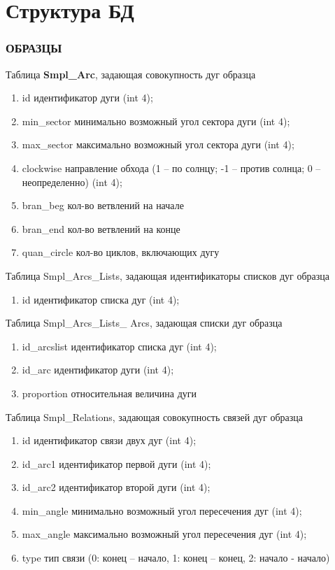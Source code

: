 \appendix
\chapter{Структура БД} \label{AppendixA}
\noindent
\subsection*{ОБРАЗЦЫ}
\noindent
Таблица \textbf{Smpl\_Arc}, задающая совокупность дуг образца
\small
\begin{enumerate}
\item id		        	идентификатор дуги (int 4);
\item min\_sector           	минимально возможный угол сектора дуги (int 4);
\item max\_sector          	максимально возможный угол сектора дуги (int 4);
\item clockwise            	направление обхода (1 – по солнцу; -1 – против солнца; 0 – неопределенно) (int 4);
\item bran\_beg            	кол-во ветвлений на начале
\item bran\_end            	кол-во ветвлений на конце
\item quan\_circle        	кол-во циклов, включающих дугу
\end{enumerate}
\normalsize

\noindent 
Таблица Smpl\_Arcs\_Lists, задающая идентификаторы списков дуг образца
\small
\begin{enumerate}
\item id		       	идентификатор списка дуг (int 4);
\end{enumerate}
\normalsize


\noindent 
Таблица Smpl\_Arcs\_Lists\_ Arcs, задающая списки дуг образца
\small
\begin{enumerate}
\item id\_arcslist		идентификатор списка дуг (int 4);
\item id\_arc		идентификатор дуги (int 4);
\item proportion		относительная величина дуги		
\end{enumerate}
\normalsize


\noindent 
Таблица Smpl\_Relations, задающая совокупность связей дуг образца
\small
\begin{enumerate}
\item id		         	идентификатор связи двух дуг (int 4);
\item id\_arc1                 	идентификатор первой дуги (int 4);
\item id\_arc2                 	идентификатор второй дуги (int 4);
\item min\_angle           	минимально возможный угол пересечения дуг (int 4);
\item max\_angle          	максимально возможный угол пересечения дуг (int 4);
\item type			тип связи (0: конец – начало, 1: конец – конец, 2: начало - начало)
\end{enumerate}
\normalsize


